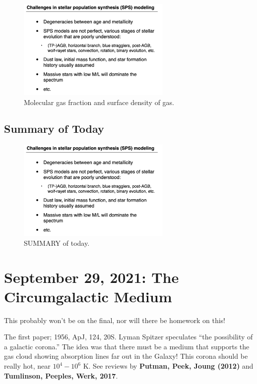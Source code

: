 \documentclass{article}
\begin{document}
\begin{figure}
    \centering
    \includegraphics[width=0.66\textwidth]{figs/Screen Shot 2021-09-24 at 9.35.27 AM.png}
    \caption{Molecular gas fraction and surface density of gas.}
    \label{fig:MORE}
\end{figure}

\subsection{Summary of Today}

\begin{figure}
    \centering
    \includegraphics[width=0.66\textwidth]{figs/Screen Shot 2021-09-24 at 9.35.27 AM.png}
    \caption{SUMMARY of today.}
    \label{fig:summmmm}
\end{figure}




\section{September 29, 2021: The Circumgalactic Medium}


This probably won't be on the final, nor will there be homework on this! 

The first paper; 1956, ApJ, 124, 20S. Lyman Spitzer speculates ``the possibility of a galactic corona.'' The idea was that there must be a medium that supports the gas cloud showing absorption lines far out in the Galaxy! This corona should be really hot, near $10^4 - 10^6$ K. See reviews by \textbf{Putman, Peek, Joung (2012)} and \textbf{Tumlinson, Peeples, Werk, 2017}.
\end{document}

